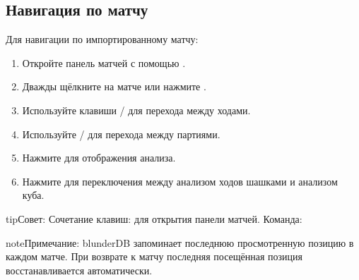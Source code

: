 \documentclass[letterpaper,10pt,russian]{sphinxmanual}
\begin{document}
\subsection{Навигация по матчу}
\label{\detokenize{guide_utilisateur:naviguer-dans-un-match}}
\sphinxAtStartPar
Для навигации по импортированному матчу:
\begin{enumerate}
%
\item {} 
\sphinxAtStartPar
Откройте панель матчей с помощью .

\item {} 
\sphinxAtStartPar
Дважды щёлкните на матче или нажмите .

\item {} 
\sphinxAtStartPar
Используйте клавиши  /  для перехода между ходами.

\item {} 
\sphinxAtStartPar
Используйте  /  для перехода между партиями.

\item {} 
\sphinxAtStartPar
Нажмите  для отображения анализа.

\item {} 
\sphinxAtStartPar
Нажмите  для переключения между анализом ходов шашками и анализом куба.

\end{enumerate}

\begin{sphinxadmonition}{tip}{Совет:}
\sphinxAtStartPar
Сочетание клавиш:  для открытия панели матчей. Команда: 
\end{sphinxadmonition}

\begin{sphinxadmonition}{note}{Примечание:}
\sphinxAtStartPar
blunderDB запоминает последнюю просмотренную позицию в каждом матче. При возврате к матчу последняя посещённая позиция восстанавливается автоматически.
\end{sphinxadmonition}
\end{document}
